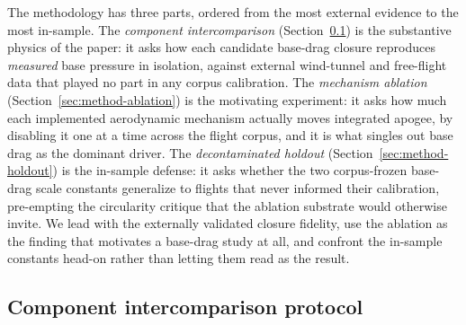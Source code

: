 
The methodology has three parts, ordered from the most external evidence to
the most in-sample. The \emph{component intercomparison}
(Section~\ref{sec:method-component}) is the substantive physics of the paper: it
asks how each candidate base-drag closure reproduces \emph{measured} base
pressure in isolation, against external wind-tunnel and free-flight data that
played no part in any corpus calibration. The \emph{mechanism ablation}
(Section~\ref{sec:method-ablation}) is the motivating experiment: it asks how
much each implemented aerodynamic mechanism actually moves integrated apogee, by
disabling it one at a time across the flight corpus, and it is what singles out
base drag as the dominant driver. The \emph{decontaminated holdout}
(Section~\ref{sec:method-holdout}) is the in-sample defense: it asks whether the
two corpus-frozen base-drag scale constants generalize to flights that never
informed their calibration, pre-empting the circularity critique that the
ablation substrate would otherwise invite. We lead with the externally validated
closure fidelity, use the ablation as the finding that motivates a base-drag
study at all, and confront the in-sample constants head-on rather than letting
them read as the result.

\subsection{Component intercomparison protocol}
\label{sec:method-component}

